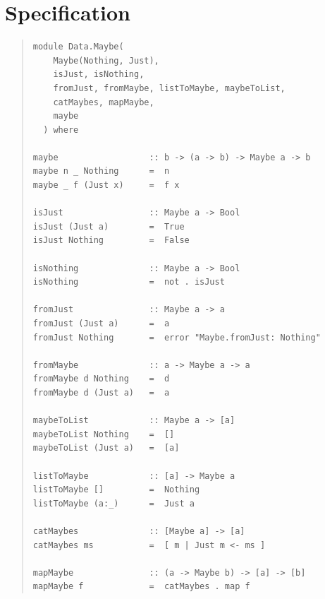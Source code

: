 \section{Specification}
\begin{quote}
{\haddockverb\begin{verbatim}
module Data.Maybe(
    Maybe(Nothing, Just),
    isJust, isNothing,
    fromJust, fromMaybe, listToMaybe, maybeToList,
    catMaybes, mapMaybe,
    maybe
  ) where

maybe                  :: b -> (a -> b) -> Maybe a -> b
maybe n _ Nothing      =  n
maybe _ f (Just x)     =  f x

isJust                 :: Maybe a -> Bool
isJust (Just a)        =  True
isJust Nothing         =  False

isNothing              :: Maybe a -> Bool
isNothing              =  not . isJust

fromJust               :: Maybe a -> a
fromJust (Just a)      =  a
fromJust Nothing       =  error "Maybe.fromJust: Nothing"

fromMaybe              :: a -> Maybe a -> a
fromMaybe d Nothing    =  d
fromMaybe d (Just a)   =  a

maybeToList            :: Maybe a -> [a]
maybeToList Nothing    =  []
maybeToList (Just a)   =  [a]

listToMaybe            :: [a] -> Maybe a
listToMaybe []         =  Nothing
listToMaybe (a:_)      =  Just a

catMaybes              :: [Maybe a] -> [a]
catMaybes ms           =  [ m | Just m <- ms ]

mapMaybe               :: (a -> Maybe b) -> [a] -> [b]
mapMaybe f             =  catMaybes . map f
\end{verbatim}}
\end{quote}